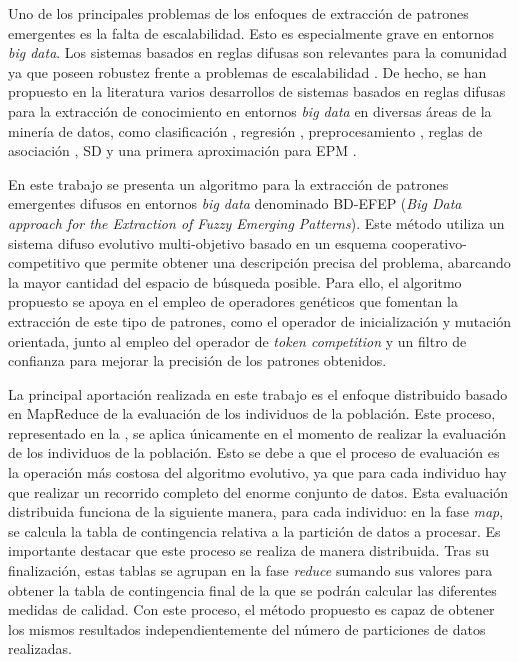 \documentclass[c5paper,10pt,twoside]{book}	   	%
\begin{document}
Uno de los principales problemas de los enfoques de extracción de patrones emergentes es la falta de escalabilidad. Esto es especialmente grave en entornos \textit{big data}. Los sistemas basados en reglas difusas son relevantes para la comunidad ya que poseen robustez frente a problemas de escalabilidad \cite{Fcdh16,Faah17}. De hecho, se han propuesto en la literatura varios desarrollos de sistemas basados en reglas difusas para la extracción de conocimiento en entornos \textit{big data} en diversas áreas de la minería de datos, como clasificación \cite{Rlbh15,Egsb18}, regresión \cite{Rmb16}, preprocesamiento \cite{Prrtbh15}, reglas de asociación \cite{Plv17}, \ac{SD} \cite{Prpgcd16} y una primera aproximación para \ac{EPM} \cite{Ggdc17}.

En este trabajo se presenta un algoritmo para la extracción de patrones emergentes difusos en entornos \textit{big data} denominado BD-EFEP (\textit{Big Data approach for the Extraction of Fuzzy Emerging Patterns}). Este método utiliza un sistema difuso evolutivo multi-objetivo basado en un esquema cooperativo-competitivo que permite obtener una descripción precisa del problema, abarcando la mayor cantidad del espacio de búsqueda posible. Para ello, el algoritmo propuesto se apoya en el empleo de operadores genéticos que fomentan la extracción de este tipo de patrones, como el operador de inicialización y mutación orientada, junto al empleo del operador de \textit{token competition} y un filtro de confianza para mejorar la precisión de los patrones obtenidos.




La principal aportación realizada en este trabajo es el enfoque distribuido basado en MapReduce de la evaluación de los individuos de la población. Este proceso, representado en la , se aplica únicamente en el momento de realizar la evaluación de los individuos de la población. Esto se debe a que el proceso de evaluación es la operación más costosa del algoritmo evolutivo, ya que para cada individuo hay que realizar un recorrido completo del enorme conjunto de datos. Esta evaluación distribuida funciona de la siguiente manera, para cada individuo: en la fase \textit{map}, se calcula la tabla de contingencia relativa a la partición de datos a procesar. Es importante destacar que este proceso se realiza de manera distribuida. Tras su finalización, estas tablas se agrupan en la fase \textit{reduce} sumando sus valores para obtener la tabla de contingencia final de la que se podrán calcular las diferentes medidas de calidad. Con este proceso, el método propuesto es capaz de obtener los mismos resultados independientemente del número de particiones de datos realizadas.
\end{document}
